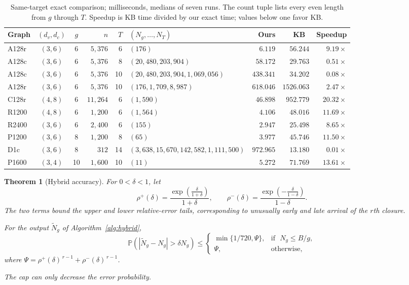 \documentclass[conference]{IEEEtran}
\newtheorem{theorem}{Theorem}
\newcommand{\Prb}{\mathbb{P}}
\begin{document}
\begin{table}[t]
\centering
\caption{Same-target exact comparison; milliseconds, medians of seven runs.
The count tuple lists every even length from $g$ through $T$.
Speedup is KB time divided by our exact time; values below one favor KB.}
\label{tab:exact-exp}
\footnotesize
\setlength{\tabcolsep}{5pt}
\begin{tabular}{lccrrlrrr}
\hline
Graph & $(d_v,d_c)$ & $g$ & $n$ & $T$ &
$(N_g,\ldots,N_T)$ & Ours & KB~\cite{karimi2013} & Speedup\\
\hline
A128r & $(3,6)$ & 6 & $5,376$ & 6 &
$(176)$ & $6.119$ & $56.244$ & $9.19\times$\\
A128c & $(3,6)$ & 6 & $5,376$ & 8 &
$(20,480, 203,904)$ &
$58.172$ & $29.763$ & $0.51\times$\\
A128c & $(3,6)$ & 6 & $5,376$ & 10 &
$(20,480, 203,904, 1,069,056)$ &
$438.341$ & $34.202$ & $0.08\times$\\
A128r & $(3,6)$ & 6 & $5,376$ & 10 &
$(176, 1,709, 8,987)$ &
$618.046$ & $1526.063$ & $2.47\times$\\
C128r & $(4,8)$ & 6 & $11,264$ & 6 &
$(1,590)$ & $46.898$ & $952.779$ & $20.32\times$\\
R1200 & $(4,8)$ & 6 & $1,200$ & 6 &
$(1,564)$ & $4.106$ & $48.016$ & $11.69\times$\\
R2400 & $(3,6)$ & 6 & $2,400$ & 6 &
$(155)$ & $2.947$ & $25.498$ & $8.65\times$\\
P1200 & $(3,6)$ & 8 & $1,200$ & 8 &
$(65)$ & $3.977$ & $45.746$ & $11.50\times$\\
D1c & $(3,6)$ & 8 & $312$ & 14 &
$(3,638, 15,670, 142,582, 1,111,500)$ &
$972.965$ & $13.180$ & $0.01\times$\\
P1600 & $(3,4)$ & 10 & $1,600$ & 10 &
$(11)$ & $5.272$ & $71.769$ & $13.61\times$\\
\hline
\end{tabular}
\end{table}

\begin{theorem}[Hybrid accuracy]\label{thm:hybrid}
For $0<\delta<1$, let
\[
\rho^+(\delta)=
\frac{\exp\!\left(\frac{\delta}{1+\delta}\right)}{1+\delta},
\qquad
\rho^-(\delta)=
\frac{\exp\!\left(-\frac{\delta}{1-\delta}\right)}{1-\delta}.
\]
The two terms bound the upper and lower relative-error tails,
corresponding to unusually early and late arrival of the $r$th closure.

For the output $\widetilde N_g$ of Algorithm~\ref{alg:hybrid},
\[
\Prb\!\left(|\widetilde N_g-N_g|>\delta N_g\right)
\le
\begin{cases}
\min\{1/720,\Psi\}, & \text{if }\,\, N_g\le B/g,\\[1mm]
\Psi, & \text{otherwise},
\end{cases}
\]
where $\Psi=\rho^+(\delta)^{\,r-1}+\rho^-(\delta)^{\,r-1}$.

The cap can only decrease the error probability.
\end{theorem}
\end{document}

